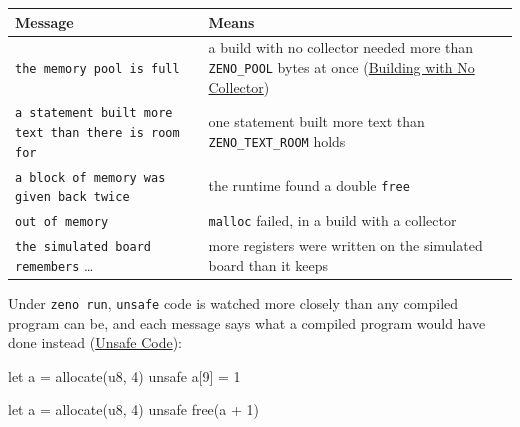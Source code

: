 \begin{longtable}{P{6.2cm}P{6.6cm}}
\toprule
Message & Means \\
\midrule
\endhead
\texttt{the memory pool is full} & a build with no collector needed more
  than \verb|ZENO_POOL| bytes at once
  (\hyperref[ch-no-collector]{Building with No Collector}) \\
\texttt{a statement built more text than there is room for} & one
  statement built more text than \verb|ZENO_TEXT_ROOM| holds \\
\texttt{a block of memory was given back twice} & the runtime found a
  double \verb|free| \\
\texttt{out of memory} & \verb|malloc| failed, in a build with a collector \\
\texttt{the simulated board remembers} \ldots & more registers were
  written on the simulated board than it keeps \\
\bottomrule
\end{longtable}

Under \verb|zeno run|, \verb|unsafe| code is watched more closely than
any compiled program can be, and each message says what a compiled
program would have done instead (\hyperref[ch-unsafe]{Unsafe Code}):

\begin{zeno}[fails=yes]
let a = allocate(u8, 4)
unsafe {
    a[9] = 1
}
\end{zeno}

\begin{zeno}[fails=yes]
let a = allocate(u8, 4)
unsafe {
    free(a + 1)
}
\end{zeno}
